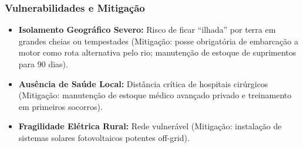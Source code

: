 \subsubsection{Vulnerabilidades e
Mitigação}

\begin{itemize}
\tightlist
\item
  \textbf{Isolamento Geográfico Severo:} Risco de ficar ``ilhada'' por
  terra em grandes cheias ou tempestades (Mitigação: posse obrigatória
  de embarcação a motor como rota alternativa pelo rio; manutenção de
  estoque de suprimentos para 90 dias).
\item
  \textbf{Ausência de Saúde Local:} Distância crítica de hospitais
  cirúrgicos (Mitigação: manutenção de estoque médico avançado privado e
  treinamento em primeiros socorros).
\item
  \textbf{Fragilidade Elétrica Rural:} Rede vulnerável (Mitigação:
  instalação de sistemas solares fotovoltaicos potentes off-grid).
\end{itemize}


